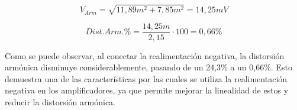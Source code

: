 \begin{equation*}
    V_{Arm} = \sqrt{11,89m^2 + 7,85m^2} = 14,25mV
\end{equation*}

\begin{equation*}
    Dist. Arm.\%= \frac{14,25m}{2,15}\cdot 100 = 0,66\%
\end{equation*}

Como se puede observar, al conectar la realimentación negativa, la distorsión armónica disminuye considerablemente, pasando de un 24,3\% a un 0,66\%. Esto demuestra una de las características por las cuales se utiliza la realimentación negativa en los amplificadores, ya que permite mejorar la linealidad de estos y reducir la distorsión armónica.
